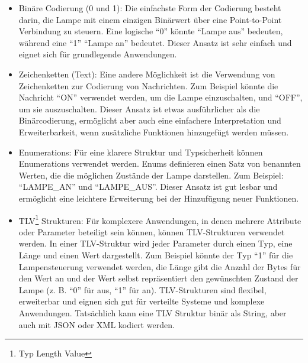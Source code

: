 \begin{itemize}
\begin{itemize}
\item Binäre Codierung (0 und 1): Die einfachste Form der Codierung besteht darin, die Lampe mit einem einzigen Binärwert über eine Point-to-Point Verbindung zu steuern. Eine logische \enquote{0} könnte \enquote{Lampe aus} bedeuten, während eine \enquote{1} \enquote{Lampe an} bedeutet. Dieser Ansatz ist sehr einfach und eignet sich für grundlegende Anwendungen.
\item Zeichenketten (Text): Eine andere Möglichkeit ist die Verwendung von Zeichenketten zur Codierung von Nachrichten. Zum Beispiel könnte die Nachricht \enquote{ON} verwendet werden, um die Lampe einzuschalten, und \enquote{OFF}, um sie auszuschalten. Dieser Ansatz ist etwas ausführlicher als die Binärcodierung, ermöglicht aber auch eine einfachere Interpretation und Erweiterbarkeit, wenn zusätzliche Funktionen hinzugefügt werden müssen.
\item Enumerations: Für eine klarere Struktur und Typsicherheit können Enumerations verwendet werden. Enums definieren einen Satz von benannten Werten, die die möglichen Zustände der Lampe darstellen. Zum Beispiel: \enquote{LAMPE\_AN} und \enquote{LAMPE\_AUS}. Dieser Ansatz ist gut lesbar und ermöglicht eine leichtere Erweiterung bei der Hinzufügung neuer Funktionen.
\item TLV\footnote{Typ Length Value} Strukturen: Für komplexere Anwendungen, in denen mehrere Attribute oder Parameter beteiligt sein können, können TLV-Strukturen verwendet werden. In einer TLV-Struktur wird jeder Parameter durch einen Typ, eine Länge und einen Wert dargestellt. Zum Beispiel könnte der Typ \enquote{1} für die Lampensteuerung verwendet werden, die Länge gibt die Anzahl der Bytes für den Wert an und der Wert selbst repräsentiert den gewünschten Zustand der Lampe (z. B. \enquote{0} für aus, \enquote{1} für an). TLV-Strukturen sind flexibel, erweiterbar und eignen sich gut für verteilte Systeme und komplexe Anwendungen. Tatsächlich kann eine TLV Struktur binär als String, aber auch mit JSON oder XML kodiert werden.
\end{itemize}


\end{itemize}
